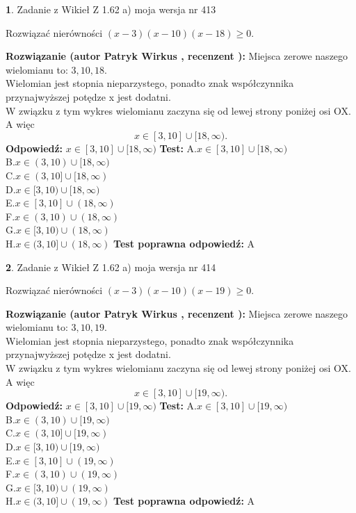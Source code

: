 \documentclass[12pt, a4paper]{article}
\theoremstyle{definition} %
\newtheorem{zad}{}
\newcommand{\zadStart}[1]{\begin{zad}#1\newline}
\newcommand{\zadStop}{\end{zad}}
\newcommand{\rozwStart}[2]{\noindent \textbf{Rozwiązanie (autor #1 , recenzent #2): }\newline}
\newcommand{\rozwStop}{\newline}
\newcommand{\odpStart}{\noindent \textbf{Odpowiedź:}\newline}
\newcommand{\odpStop}{\newline}
\newcommand{\testStart}{\noindent \textbf{Test:}\newline}
\newcommand{\testStop}{\newline}
\newcommand{\kluczStart}{\noindent \textbf{Test poprawna odpowiedź:}\newline}
\newcommand{\kluczStop}{\newline}
\begin{document}
\zadStart{Zadanie z Wikieł Z 1.62 a) moja wersja nr 413}

Rozwiązać nierówności $(x-3)(x-10)(x-18)\ge0$.
\zadStop
\rozwStart{Patryk Wirkus}{}
Miejsca zerowe naszego wielomianu to: $3, 10, 18$.\\
Wielomian jest stopnia nieparzystego, ponadto znak współczynnika przy\linebreak najwyższej potędze x jest dodatni.\\ W związku z tym wykres wielomianu zaczyna się od lewej strony poniżej osi OX. A więc $$x \in [3,10] \cup [18,\infty).$$
\rozwStop
\odpStart
$x \in [3,10] \cup [18,\infty)$
\odpStop
\testStart
A.$x \in [3,10] \cup [18,\infty)$\\
B.$x \in (3,10) \cup [18,\infty)$\\
C.$x \in (3,10] \cup [18,\infty)$\\
D.$x \in [3,10) \cup [18,\infty)$\\
E.$x \in [3,10] \cup (18,\infty)$\\
F.$x \in (3,10) \cup (18,\infty)$\\
G.$x \in [3,10) \cup (18,\infty)$\\
H.$x \in (3,10] \cup (18,\infty)$
\testStop
\kluczStart
A
\kluczStop



\zadStart{Zadanie z Wikieł Z 1.62 a) moja wersja nr 414}

Rozwiązać nierówności $(x-3)(x-10)(x-19)\ge0$.
\zadStop
\rozwStart{Patryk Wirkus}{}
Miejsca zerowe naszego wielomianu to: $3, 10, 19$.\\
Wielomian jest stopnia nieparzystego, ponadto znak współczynnika przy\linebreak najwyższej potędze x jest dodatni.\\ W związku z tym wykres wielomianu zaczyna się od lewej strony poniżej osi OX. A więc $$x \in [3,10] \cup [19,\infty).$$
\rozwStop
\odpStart
$x \in [3,10] \cup [19,\infty)$
\odpStop
\testStart
A.$x \in [3,10] \cup [19,\infty)$\\
B.$x \in (3,10) \cup [19,\infty)$\\
C.$x \in (3,10] \cup [19,\infty)$\\
D.$x \in [3,10) \cup [19,\infty)$\\
E.$x \in [3,10] \cup (19,\infty)$\\
F.$x \in (3,10) \cup (19,\infty)$\\
G.$x \in [3,10) \cup (19,\infty)$\\
H.$x \in (3,10] \cup (19,\infty)$
\testStop
\kluczStart
A
\kluczStop
\end{document}
